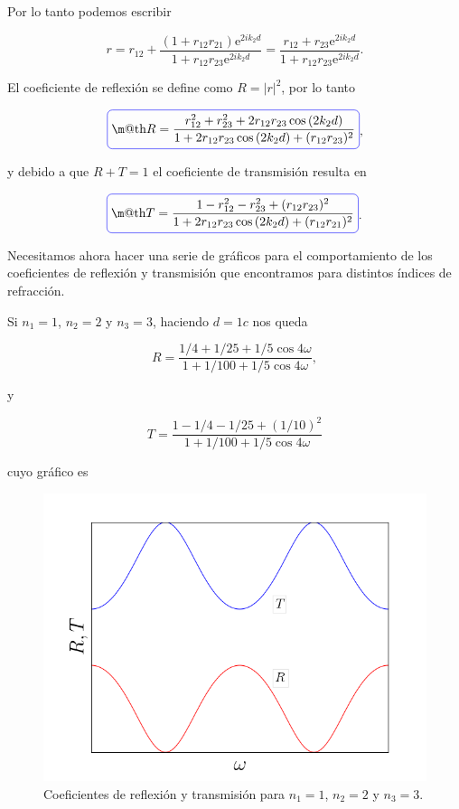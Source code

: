 \documentclass[a4paper,11pt]{article}
\makeatletter
\numberwithin{equation}{section}
\newcommand*{\boxcolor}{blue}
\renewcommand{\boxed}[1]{\textcolor{\boxcolor}{%
\tikz[baseline={([yshift=-1ex]current bounding box.center)}] \node [rectangle, minimum width=1ex,rounded corners,draw] {\normalcolor\m@th$\displaystyle#1$};}}
\newcommand{\euler}{\mathrm{e}}
\makeatother
\begin{document}
Por lo tanto podemos escribir 

\begin{equation}
 r = r_{12} + \frac{(1 + r_{12}r_{21})\euler^{2ik_2d}}{1 + r_{12}r_{23}\euler^{2ik_2d}} = 
 \frac{r_{12} + r_{23}\euler^{2ik_2d}}{1 + r_{12}r_{23}\euler^{2ik_2d}}.
\end{equation}

El coeficiente de reflexión se define como $R = |r|^2$, por lo tanto 

\begin{equation}
 \boxed{R = \frac{r_{12}^2 + r_{23}^2 + 2r_{12}r_{23}\cos{(2k_2d)}}{1 + 2r_{12}r_{23} 
 \cos{(2k_2d)} + (r_{12}r_{23})^2}},
\end{equation}

y debido a que $R + T = 1$ el coeficiente de transmisión resulta en 

\begin{equation}
 \boxed{T = \frac{1 - r_{12}^2 - r_{23}^2 + (r_{12}r_{23})^2}{1 + 2r_{12}r_{23}\cos{(2k_2d)} 
 + (r_{12}r_{21})^2}}.
\end{equation}

Necesitamos ahora hacer una serie de gráficos para el comportamiento de los coeficientes 
de reflexión y transmisión que encontramos para distintos índices de refracción. 

\vspace{.3cm}

Si $n_1 = 1$, $n_2 = 2$ y $n_3 = 3$, haciendo $d = 1c$ nos queda 

\begin{equation}
 R = \frac{1/4 + 1/25 + 1/5\cos{4\omega}}{1 + 1/100 + 1/5\cos{4\omega}},
\end{equation}

y 

\begin{equation}
 T = \frac{1 - 1/4 - 1/25 + (1/10)^2}{1 + 1/100 + 1/5\cos{4\omega}}
\end{equation}

cuyo gráfico es 

\begin{figure}[H]
 \center 
 \includegraphics[scale=0.5]{problema1fig2}
 \caption{Coeficientes de reflexión y transmisión para $n_1 = 1$, $n_2 = 2$ y $n_3 = 3$.}
\end{figure}
\end{document}
